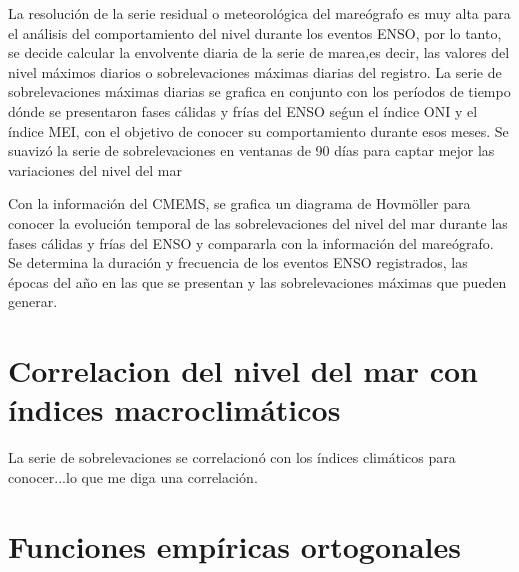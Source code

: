 La resolución de la serie residual o meteorológica del mareógrafo es muy alta para el análisis del comportamiento del nivel durante los eventos ENSO, por lo tanto, se decide calcular la envolvente diaria de la serie de marea,es decir, las valores del nivel máximos diarios o sobrelevaciones máximas diarias del registro. La serie de sobrelevaciones máximas diarias se grafica en conjunto con los períodos de tiempo dónde se presentaron fases cálidas y frías del ENSO seǵun el índice ONI y el índice MEI, con el objetivo de conocer su comportamiento durante esos meses. Se suavizó la serie de sobrelevaciones en ventanas de 90 días para captar mejor las variaciones del nivel del mar

Con la información del CMEMS, se grafica un diagrama de Hovmöller para conocer la evolución temporal de las sobrelevaciones del nivel del mar durante las fases cálidas y frías del ENSO y compararla con la información del mareógrafo. Se determina la duración y frecuencia de los eventos ENSO registrados, las épocas del año en las que se presentan y las sobrelevaciones máximas que pueden generar.

\section{Correlacion del nivel del mar con índices macroclimáticos}
	
La serie de sobrelevaciones se correlacionó con los índices climáticos para conocer...lo que me diga una correlación.

\section{Funciones empíricas ortogonales}


